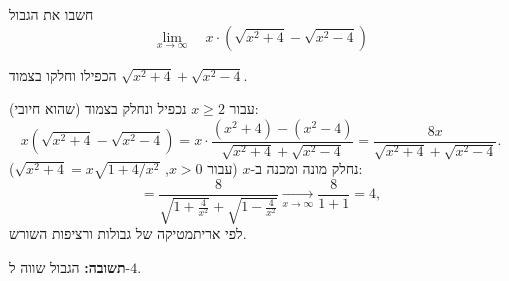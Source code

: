 
\begin{question}
חשבו את הגבול
\[ \lim_{x\to\infty}\quad x\cdot\left(\sqrt{x^2 + 4} - \sqrt{x^2 - 4}\right) \]
\end{question}

\begin{hint}
הכפילו וחלקו בצמוד $\sqrt{x^2+4} + \sqrt{x^2-4}$.
\end{hint}

\begin{solution}
עבור $x \ge 2$ נכפיל ונחלק בצמוד (שהוא חיובי):
\[ x\left(\sqrt{x^2+4} - \sqrt{x^2-4}\right) = x\cdot\frac{(x^2 + 4) - (x^2 - 4)}{\sqrt{x^2+4} + \sqrt{x^2-4}} = \frac{8x}{\sqrt{x^2+4} + \sqrt{x^2-4}}. \]
נחלק מונה ומכנה ב-$x$ (עבור $x>0$, $\sqrt{x^2 + 4} = x\sqrt{1 + 4/x^2}$):
\[ = \frac{8}{\sqrt{1 + \frac4{x^2}} + \sqrt{1 - \frac4{x^2}}} \xrightarrow[x\to\infty]{} \frac{8}{1 + 1} = 4, \]
לפי אריתמטיקה של גבולות ורציפות השורש.

\textbf{תשובה:} הגבול שווה ל-$4$.
\end{solution}
